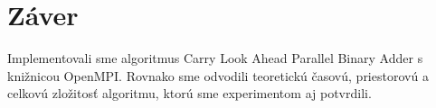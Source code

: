 \documentclass[11pt,a4paper,titlepage,final]{article}
\begin{document}
\section{Záver}
Implementovali sme algoritmus Carry Look Ahead Parallel Binary Adder s knižnicou OpenMPI. Rovnako sme odvodili teoretickú časovú, priestorovú a celkovú zložitosť algoritmu, ktorú sme experimentom aj potvrdili.
\end{document}

